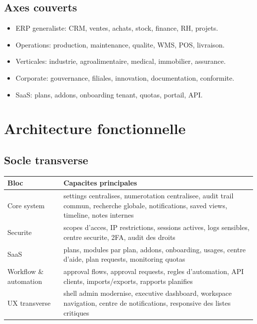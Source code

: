 \documentclass[11pt,a4paper]{article}
\begin{document}
\subsection{Axes couverts}
\begin{itemize}[leftmargin=1.2cm]
    \item ERP generaliste: CRM, ventes, achats, stock, finance, RH, projets.
    \item Operations: production, maintenance, qualite, WMS, POS, livraison.
    \item Verticales: industrie, agroalimentaire, medical, immobilier, assurance.
    \item Corporate: gouvernance, filiales, innovation, documentation, conformite.
    \item SaaS: plans, addons, onboarding tenant, quotas, portail, API.
\end{itemize}

\section{Architecture fonctionnelle}
\subsection{Socle transverse}
\begin{longtable}{p{4cm}p{10cm}}
\toprule
\textbf{Bloc} & \textbf{Capacites principales} \\
\midrule
Core system & settings centralises, numerotation centralisee, audit trail commun, recherche globale, notifications, saved views, timeline, notes internes \\
Securite & scopes d'acces, IP restrictions, sessions actives, logs sensibles, centre securite, 2FA, audit des droits \\
SaaS & plans, modules par plan, addons, onboarding, usages, centre d'aide, plan requests, monitoring quotas \\
Workflow \& automation & approval flows, approval requests, regles d'automation, API clients, imports/exports, rapports planifies \\
UX transverse & shell admin modernise, executive dashboard, workspace navigation, centre de notifications, responsive des listes critiques \\
\bottomrule
\end{longtable}
\end{document}
